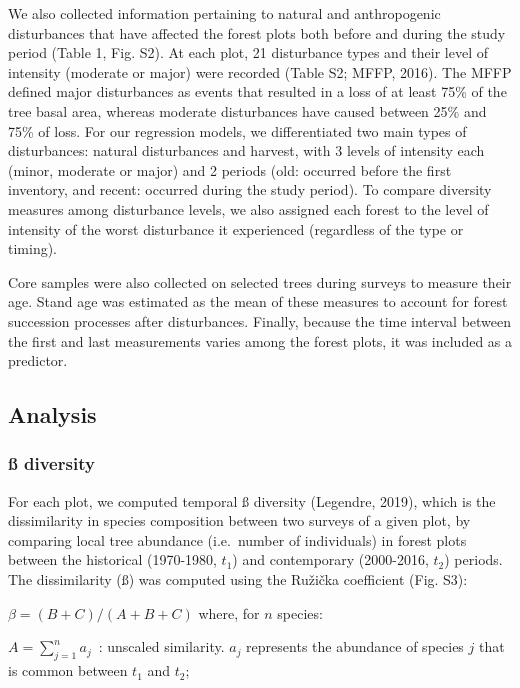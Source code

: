 \documentclass[a4paperpaper,]{article}
\begin{document}
We also collected information pertaining to natural and anthropogenic
disturbances that have affected the forest plots both before and during
the study period (Table 1, Fig. S2). At each plot, 21 disturbance types
and their level of intensity (moderate or major) were recorded (Table
S2; MFFP, 2016). The MFFP defined major disturbances as events that
resulted in a loss of at least 75\% of the tree basal area, whereas
moderate disturbances have caused between 25\% and 75\% of loss. For our
regression models, we differentiated two main types of disturbances:
natural disturbances and harvest, with 3 levels of intensity each
(minor, moderate or major) and 2 periods (old: occurred before the first
inventory, and recent: occurred during the study period). To compare
diversity measures among disturbance levels, we also assigned each
forest to the level of intensity of the worst disturbance it experienced
(regardless of the type or timing).

Core samples were also collected on selected trees during surveys to
measure their age. Stand age was estimated as the mean of these measures
to account for forest succession processes after disturbances. Finally,
because the time interval between the first and last measurements varies
among the forest plots, it was included as a predictor.

\hypertarget{analysis}{%
\subsection{Analysis}\label{analysis}}

\hypertarget{uxdf-diversity}{%
\subsubsection{ß diversity}\label{uxdf-diversity}}

For each plot, we computed temporal ß diversity (Legendre, 2019), which
is the dissimilarity in species composition between two surveys of a
given plot, by comparing local tree abundance (i.e.~number of
individuals) in forest plots between the historical (1970-1980, \(t_1\))
and contemporary (2000-2016, \(t_2\)) periods. The dissimilarity (ß) was
computed using the Ružička coefficient (Fig. S3):

\(\beta = (B+C)/(A+B+C)\) where, for \(n\) species:

\(A = \sum_{j=1}^n a_j\)~: unscaled similarity. \(a_j\) represents the
abundance of species \(j\) that is common between \(t_1\) and \(t_2\);~
\end{document}
